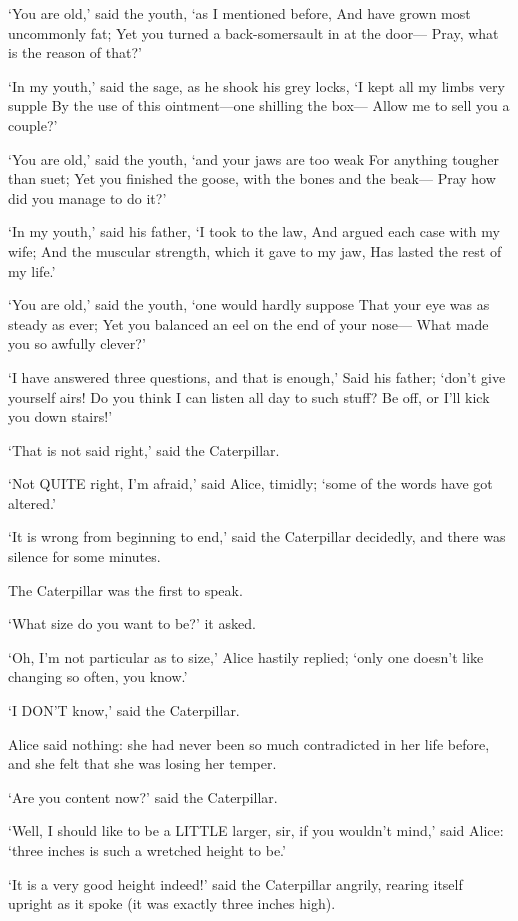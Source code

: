 \documentclass[12pt]{article}
\begin{document}
\begin{Parallel}[p]{}{}
{   ‘You are old,’ said the youth, ‘as I mentioned before,
    And have grown most uncommonly fat;
   Yet you turned a back-somersault in at the door—
    Pray, what is the reason of that?’

   ‘In my youth,’ said the sage, as he shook his grey locks,
    ‘I kept all my limbs very supple
   By the use of this ointment—one shilling the box—
    Allow me to sell you a couple?’

   ‘You are old,’ said the youth, ‘and your jaws are too weak
    For anything tougher than suet;
   Yet you finished the goose, with the bones and the beak—
    Pray how did you manage to do it?’

   ‘In my youth,’ said his father, ‘I took to the law,
    And argued each case with my wife;
   And the muscular strength, which it gave to my jaw,
    Has lasted the rest of my life.’

   ‘You are old,’ said the youth, ‘one would hardly suppose
    That your eye was as steady as ever;
   Yet you balanced an eel on the end of your nose—
    What made you so awfully clever?’

   ‘I have answered three questions, and that is enough,’
    Said his father; ‘don’t give yourself airs!
   Do you think I can listen all day to such stuff?
    Be off, or I’ll kick you down stairs!’


‘That is not said right,’ said the Caterpillar.

‘Not QUITE right, I’m afraid,’ said Alice, timidly; ‘some of the words have got altered.’

‘It is wrong from beginning to end,’ said the Caterpillar decidedly, and there was silence for some minutes.

The Caterpillar was the first to speak.

‘What size do you want to be?’ it asked.

‘Oh, I’m not particular as to size,’ Alice hastily replied; ‘only one doesn’t like changing so often, you know.’

‘I DON’T know,’ said the Caterpillar.

Alice said nothing: she had never been so much contradicted in her life before, and she felt that she was losing her temper.

‘Are you content now?’ said the Caterpillar.

‘Well, I should like to be a LITTLE larger, sir, if you wouldn’t mind,’ said Alice: ‘three inches is such a wretched height to be.’

‘It is a very good height indeed!’ said the Caterpillar angrily, rearing itself upright as it spoke (it was exactly three inches high).

}
\end{Parallel}
\end{document}
